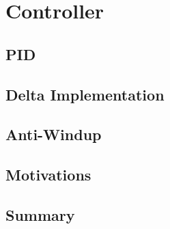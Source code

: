 \chapter{Controller}
\label{chap:seventh}
\ifpdf
    \graphicspath{{Chapter7/Figures/PNG/}{Chapter7/Figures/PDF/}{Chapter7/Figures/}{Chapter7/Figures/EPS/}}
\else
    \graphicspath{{Chapter7/Figures/EPS/}{Chapter7/Figures/}}
\fi


\section{PID}
\section{Delta Implementation}
\section{Anti-Windup}
\section{Motivations}
\section{Summary}